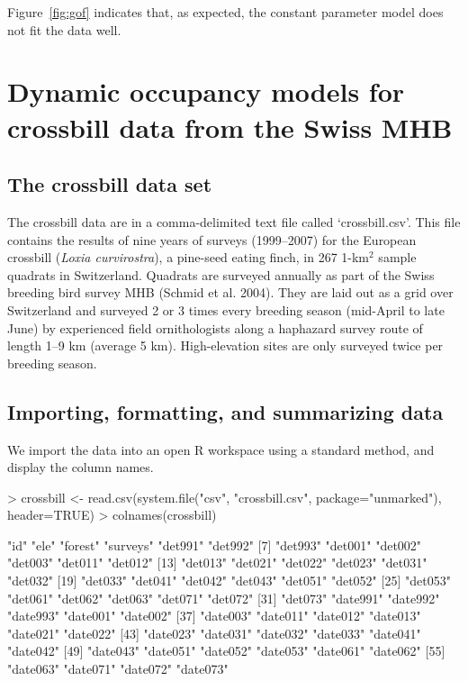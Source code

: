 \documentclass[12pt]{article}
\renewenvironment{Schunk}{\vspace{\topsep}}{\vspace{\topsep}}
\begin{document}
Figure~\ref{fig:gof} indicates that, as expected, the constant
parameter model does not fit the data well.



\section{Dynamic occupancy models for crossbill data from the Swiss MHB}

\subsection{The crossbill data set}
The crossbill data are in a comma-delimited text file called
`crossbill.csv'.
This file contains the results of nine years of surveys (1999--2007)
for the European crossbill (\emph{Loxia curvirostra}),
a pine-seed eating finch, in 267 1-km$^2$ sample quadrats in Switzerland.
Quadrats are surveyed annually as part of the Swiss breeding bird
survey MHB (Schmid et al. 2004).
They are laid out as a grid over Switzerland and surveyed 2 or 3 times
every breeding season (mid-April to late June)
by experienced field ornithologists along a haphazard survey route of
length 1--9 km (average 5 km).
High-elevation sites are only surveyed twice per breeding season.



\subsection{Importing, formatting, and summarizing data}
We import the data into an open R workspace using a standard method,
and display the column names.

\begin{small}

\begin{Schunk}
\begin{Sinput}
> crossbill <- read.csv(system.file("csv", "crossbill.csv",
     package="unmarked"), header=TRUE)
> colnames(crossbill)
\end{Sinput}
\begin{Soutput}
 [1] "id"      "ele"     "forest"  "surveys" "det991"  "det992" 
 [7] "det993"  "det001"  "det002"  "det003"  "det011"  "det012" 
[13] "det013"  "det021"  "det022"  "det023"  "det031"  "det032" 
[19] "det033"  "det041"  "det042"  "det043"  "det051"  "det052" 
[25] "det053"  "det061"  "det062"  "det063"  "det071"  "det072" 
[31] "det073"  "date991" "date992" "date993" "date001" "date002"
[37] "date003" "date011" "date012" "date013" "date021" "date022"
[43] "date023" "date031" "date032" "date033" "date041" "date042"
[49] "date043" "date051" "date052" "date053" "date061" "date062"
[55] "date063" "date071" "date072" "date073"
\end{Soutput}
\end{Schunk}
\end{small}
\end{document}

